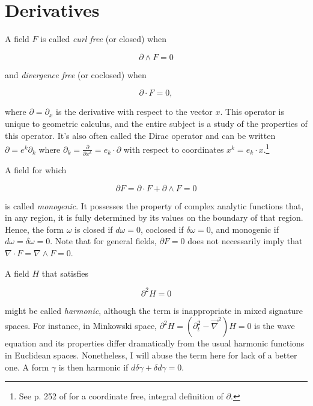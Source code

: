 \documentclass[twocolumn]{article}
\begin{document}
\section{Derivatives}

A field $F$ is called \emph{curl free} (or closed) when 

\begin{equation}
  \partial \wedge F = 0
\end{equation}

and \emph{divergence free} (or coclosed) when 

\begin{equation}
  \partial \cdot F = 0,
\end{equation}

where $\partial = \partial_x$ is the derivative with respect to the vector $x$. This operator is unique to geometric calculus, and the entire subject is a study of the properties of this operator. It's also often called the Dirac operator and can be written $\partial = e^k \partial_k$ where $\partial_k = \frac{\partial}{\partial x^k} = e_k \cdot \partial$ with respect to coordinates $x^k = e_k \cdot x$.\footnote{See p. 252 of \cite{cagc} for a coordinate free, integral definition of $\partial$.}

A field for which

\begin{equation}
  \partial F = \partial \cdot F + \partial \wedge F = 0
\end{equation}

is called \emph{monogenic}. It possesses the property of complex analytic functions that, in any region, it is fully determined by its values on the boundary of that region. Hence, the form $\omega$ is closed if $d \omega = 0$, coclosed if $\delta \omega = 0$, and monogenic if $d \omega = \delta \omega = 0$. Note that for general fields, $\partial F = 0$ does not necessarily imply that $\nabla \cdot F = \nabla \wedge F = 0$.

A field $H$ that satisfies

\begin{equation}
  \partial^2 H = 0
\end{equation}

might be called \emph{harmonic}, although the term is inappropriate in mixed signature spaces. For instance, in Minkowski space, $\partial^2 H = (\partial_t^2 - \vec \nabla^2) H = 0$ is the wave equation and its properties differ dramatically from the usual harmonic functions in Euclidean spaces. Nonetheless, I will abuse the term here for lack of a better one. A form $\gamma$ is then harmonic if $d \delta \gamma + \delta d \gamma = 0$.
\end{document}
